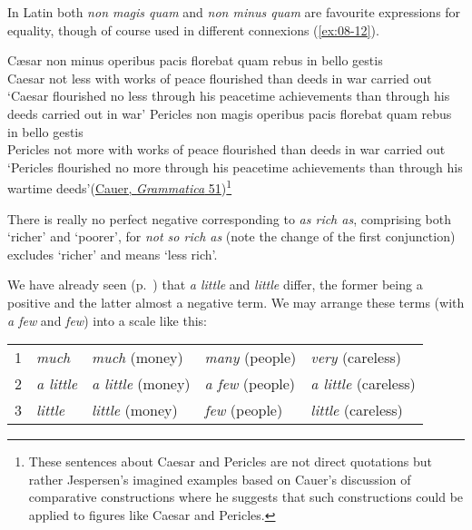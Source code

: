 In Latin both \textit{non magis quam} and \textit{non minus quam} are favourite expressions for equality, though of course used in different connexions (\ref{ex:08-12}).

\ea \label{ex:08-12}
\ea
\gll Cæsar non minus operibus pacis florebat quam rebus in bello gestis\\
 Caesar not less {with works} {of peace} flourished than deeds in war {carried out}\\
\glt `Caesar flourished no less through his peacetime achievements than through his deeds carried out in war'
\ex 
\gll Pericles non magis operibus pacis florebat quam rebus in bello gestis\\
 Pericles not more {with works} {of peace} flourished than deeds in war {carried out}\\
\glt `Pericles flourished no more through his peacetime achievements than through his wartime deeds'\hfill(\href{https://archive.org/details/grammaticamilit00cauegoog/page/50/mode/2up?view=theater&q=%22minus+operibus+pacis%22}{Cauer, \textit{Grammatica} 51})\footnote{These sentences about Caesar and Pericles are not direct quotations but rather Jespersen's imagined examples based on Cauer's discussion of comparative constructions where he suggests that such constructions could be applied to figures like Caesar and Pericles. \eds}
\z
\z
{}

There is really no perfect negative corresponding to \textit{as rich as}, comprising both `richer' and `poorer', for \textit{not so rich as} (note the change of the first conjunction) excludes `richer' and means `less rich'.

We have already seen (p.~\pageref{para:little-a-little}) that \textit{a little} and \textit{little} differ, the former being a positive and the latter almost a negative term. We may arrange these terms (with \textit{a few} and \textit{few}) into a scale like this: 

\bigskip
\centering
\begin{tabular}{rllll}\label{tab:quantitative_expressions}
1 & \textit{much} & \textit{much} (money) & \textit{many} (people) & \textit{very} (careless) \\ 
2 & \textit{a little} & \textit{a little} (money) & \textit{a few} (people) & \textit{a little} (careless) \\ 
3 & \textit{little} & \textit{little} (money) & \textit{few} (people) & \textit{little} (careless) \\ 
\end{tabular}
\justifying

